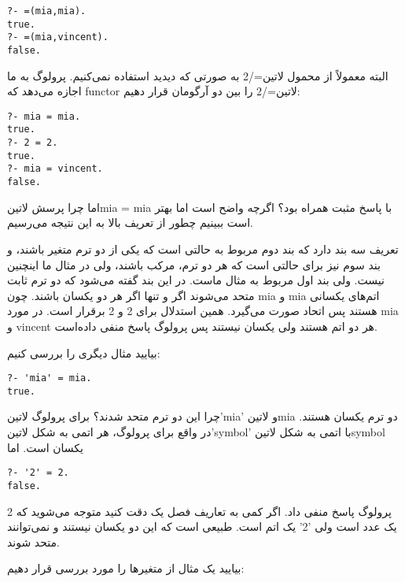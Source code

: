 \begin{latin}
\begin{lstlisting}
?- =(mia,mia).
true.
?- =(mia,vincent).
false.
\end{lstlisting}
\end{latin}

البته معمولاً از محمول ‌لاتین{=/2} به صورتی که دیدید استفاده نمی‌کنیم. پرولوگ به ما اجازه می‌دهد که functor  ‌لاتین{=/2} را بین دو آرگومان قرار دهیم:

\begin{latin}
\begin{lstlisting}
?- mia = mia.
true.
?- 2 = 2.
true.
?- mia = vincent.
false.
\end{lstlisting}
\end{latin}

اما چرا پرسش ‌لاتین{mia = mia} با پاسخ مثبت همراه بود؟ اگرچه واضح است اما بهتر است ببینیم چطور از تعریف بالا به این نتیجه می‌رسیم.

تعریف سه بند دارد که بند دوم مربوط به حالتی است که یکی از دو ترم متغیر باشند، و بند سوم نیز برای حالتی است که هر دو ترم، مرکب باشند، ولی در مثال ما اینچنین نیست. ولی بند اول مربوط به مثال ماست. در این بند گفته می‌شود که دو ترم ثابت متحد می‌شوند اگر و تنها اگر هر دو یکسان باشند. چون mia و mia اتم‌های یکسانی هستند پس اتحاد صورت می‌گیرد. همین استدلال برای 2 و 2 برقرار است. در مورد mia و vincent هر دو اتم هستند ولی یکسان نیستند پس پرولوگ پاسخ منفی داده‌است.

بیایید مثال دیگری را بررسی کنیم:

\begin{latin}
\begin{lstlisting}
?- 'mia' = mia.
true.
\end{lstlisting}
\end{latin}

چرا این دو ترم متحد شدند؟  برای پرولوگ ‌لاتین{'mia'} و ‌لاتین{mia} دو ترم یکسان هستند. در واقع برای پرولوگ، هر اتمی به شکل ‌لاتین{'symbol'} با اتمی به شکل ‌لاتین{symbol} یکسان است. اما

\begin{latin}
\begin{lstlisting}
?- '2' = 2.
false.
\end{lstlisting}
\end{latin}

پرولوگ پاسخ منفی داد. اگر کمی به تعاریف فصل یک دقت کنید متوجه می‌شوید که 2 یک عدد است ولی '2' یک اتم است. طبیعی است که این دو یکسان نیستند و نمی‌توانند متحد شوند.

بیایید یک مثال از متغیرها را مورد بررسی قرار دهیم:

